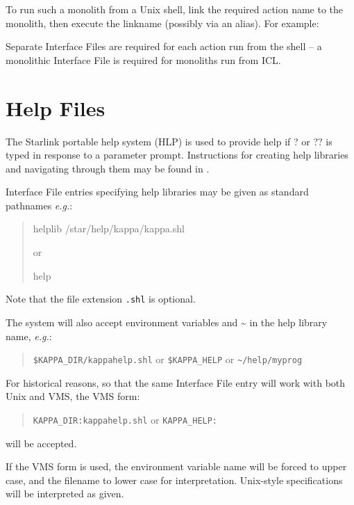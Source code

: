 \documentclass[twoside,11pt,nolof]{starlink}
\begin{document}
To run such a monolith from a Unix shell, link the required action name to the
monolith, then execute the linkname (possibly via an alias). For example:

\begin{terminalv}
\end{terminalv}

Separate Interface Files are required for each action run from the shell
-- a monolithic Interface File is required for monoliths run from ICL.

\section{Help Files}
The Starlink portable help system (HLP) is used to provide help if ? or ?? is
typed in response to a parameter prompt.
Instructions for creating help libraries and navigating through them may be
found in
.

Interface File entries specifying help libraries may be given as standard
pathnames \textit{e.g.}:
\begin{quote}
\begin{terminalv}
helplib /star/help/kappa/kappa.shl
\end{terminalv}
or
\begin{terminalv}
help %
\end{terminalv}
\end{quote}
Note that the file extension \texttt{.shl} is optional.

The system will also accept environment variables and \~{} in the help
library name, \textit{e.g.}:
\begin{quote}
\texttt{\$KAPPA\_DIR/kappahelp.shl} or \texttt{\$KAPPA\_HELP} or
\texttt{\~{}/help/myprog}
\end{quote}

For historical reasons, so that the same Interface File entry will work with
both Unix and VMS, the VMS form:
\begin{quote}
\texttt{KAPPA\_DIR:kappahelp.shl} or \texttt{KAPPA\_HELP:}
\end{quote}
will be accepted.

If the VMS form is used, the environment variable name will be forced to upper
case, and the filename to lower case for interpretation.
Unix-style specifications will be interpreted as given.
\end{document}
